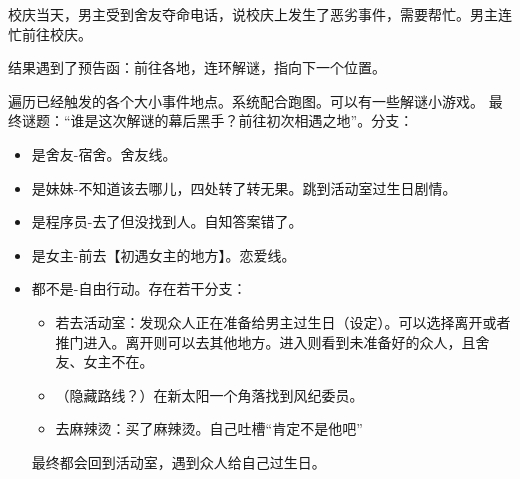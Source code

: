 校庆当天，男主受到舍友夺命电话，说校庆上发生了恶劣事件，需要帮忙。男主连忙前往校庆。

结果遇到了预告函：前往各地，连环解谜，指向下一个位置。

遍历已经触发的各个大小事件地点。系统配合跑图。可以有一些解谜小游戏。
最终谜题：“谁是这次解谜的幕后黑手？前往初次相遇之地”。分支：
\begin{itemize}
    \item 是舍友-宿舍。舍友线。
    \item 是妹妹-不知道该去哪儿，四处转了转无果。跳到活动室过生日剧情。
    \item 是程序员-去了但没找到人。自知答案错了。
    \item 是女主-前去【初遇女主的地方】。恋爱线。
    \item 都不是-自由行动。存在若干分支：
    \begin{itemize}
        \item 若去活动室：发现众人正在准备给男主过生日（设定）。可以选择离开或者推门进入。离开则可以去其他地方。进入则看到未准备好的众人，且舍友、女主不在。
        \item （隐藏路线？）在新太阳一个角落找到风纪委员。
        \item 去麻辣烫：买了麻辣烫。自己吐槽“肯定不是他吧”

    \end{itemize}
         最终都会回到活动室，遇到众人给自己过生日。
\end{itemize}
    